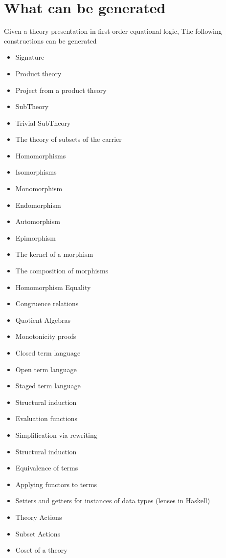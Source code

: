\section{What can be generated}
\label{sec:toBeGenerated}
Given a theory presentation  in first order equational logic, The following constructions can be generated 
\begin{itemize}
    \item Signature 
    \item Product theory 
    \item Project from a product theory 
    \item SubTheory 
    \item Trivial SubTheory 
    \item The theory of subsets of the carrier 
    \item Homomorphisms 
    \item Isomorphisms 
    \item Monomorphism 
    \item Endomorphism 
    \item Automorphism 
    \item Epimorphism 
    \item The kernel of a morphism 
    \item The composition of morphisms 
    \item Homomorphism Equality 
    \item Congruence relations 
    \item Quotient Algebras
    \item Monotonicity proofs 
    \item Closed term language 
    \item Open term language 
    \item Staged term language 
    \item Structural induction 
    \item Evaluation functions 
    \item Simplification via rewriting 
    \item Structural induction 
    \item Equivalence of terms 
    \item Applying functors to terms 
    \item Setters and getters for instances of data types (lenses in Haskell) 
    \item Theory Actions 
    \item Subset Actions
    \item Coset of a theory 
\end{itemize}

